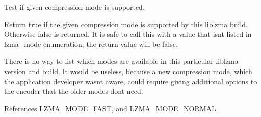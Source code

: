 Test if given compression mode is supported. 

Return true if the given compression mode is supported by this liblzma build. Otherwise false is returned. It is safe to call this with a value that isn\textquotesingle{}t listed in lzma\+\_\+mode enumeration; the return value will be false.

There is no way to list which modes are available in this particular liblzma version and build. It would be useless, because a new compression mode, which the application developer wasn\textquotesingle{}t aware, could require giving additional options to the encoder that the older modes don\textquotesingle{}t need. 

References L\+Z\+M\+A\+\_\+\+M\+O\+D\+E\+\_\+\+F\+A\+ST, and L\+Z\+M\+A\+\_\+\+M\+O\+D\+E\+\_\+\+N\+O\+R\+M\+AL.

